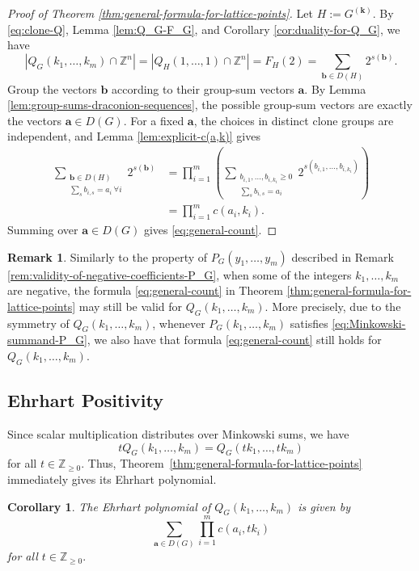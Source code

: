 \documentclass[11pt,a4paper]{article}
\newcommand{\vct}[1]{\boldsymbol{#1}}
\newcommand{\Z}{\mathbb{Z}}
\newcommand{\1}{\mathbf{1}}
\theoremstyle{plain}
\newtheorem{corollary}[theorem]{Corollary}
\theoremstyle{definition}
\newtheorem{remark}[theorem]{Remark}
\begin{document}
\begin{proof}[Proof of Theorem \ref{thm:general-formula-for-lattice-points}]
Let $H:=G^{(\vct{k})}$. By \eqref{eq:clone-Q}, Lemma \ref{lem:Q_G-F_G}, and Corollary \ref{cor:duality-for-Q_G}, we have
\[
|Q_G(k_1,\ldots,k_m)\cap\Z^n|
=|Q_H(1,\ldots,1)\cap\Z^n|
=F_H(2)
=\sum_{\vct{b}\in D(H)}2^{s(\vct{b})}.
\]
Group the vectors $\vct{b}$ according to their group-sum vectors $\vct{a}$. By Lemma \ref{lem:group-sums-draconion-sequences}, the possible group-sum vectors are exactly the vectors $\vct{a}\in D(G)$. For a fixed $\vct{a}$, the choices in distinct clone groups are independent, and Lemma \ref{lem:explicit-c(a,k)} gives
\begin{align*}
\sum_{\substack{\vct{b}\in D(H)\\\sum_s b_{i,s}=a_i\ \forall i}}2^{s(\vct{b})}
&=\prod_{i=1}^m
\left(
\sum_{\substack{b_{i,1},\ldots,b_{i,k_i}\ge0\\\sum_s b_{i,s}=a_i}}
2^{s(b_{i,1},\ldots,b_{i,k_i})}
\right)\\
&=\prod_{i=1}^m c(a_i,k_i).
\end{align*}
Summing over $\vct{a}\in D(G)$ gives \eqref{eq:general-count}.
\end{proof}

\begin{remark}\label{rem:validity-of-negative-coefficients-Q_G}
    Similarly to the property of $P_G(y_1,\dots,y_m)$ described in Remark \ref{rem:validity-of-negative-coefficients-P_G}, when some of the integers $k_1, \dots, k_m$ are negative, the formula \eqref{eq:general-count} in Theorem \ref{thm:general-formula-for-lattice-points} may still be valid for $Q_G(k_1, \dots, k_m)$. More precisely, due to the symmetry of $Q_G(k_1,\dots, k_m)$, whenever $P_G(k_1,\dots, k_m)$ satisfies \eqref{eq:Minkowski-summand-P_G}, we also have that formula \eqref{eq:general-count} still holds for $Q_G(k_1,\dots, k_m)$.
\end{remark}

\subsection{Ehrhart Positivity}

Since scalar multiplication distributes over Minkowski sums, we have
\[
tQ_G(k_1, \dots, k_m)=Q_G(tk_1,\ldots,tk_m)
\]
for all $t \in \Z_{\geq 0}.$ Thus, Theorem~\ref{thm:general-formula-for-lattice-points} immediately gives its Ehrhart polynomial.

\begin{corollary} The Ehrhart polynomial of $Q_G(k_1, \dots, k_m)$ is given by
\begin{equation}
\sum_{\vct{a}\in D(G)}\prod_{i=1}^m c(a_i,tk_i)
\label{eq:ehrhart-formula}
\end{equation}
for all $t \in \Z_{\geq 0}.$
\end{corollary}
\end{document}
